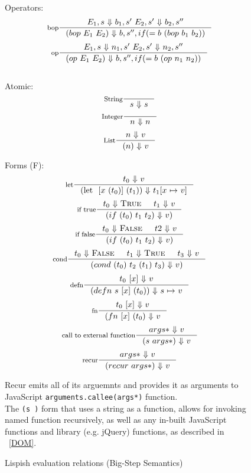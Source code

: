 \begin{figure}[h]
\centering
Operators:\
\[
\inference[bop]{E_1, s \ $$\Downarrow$$ \ b_1, s' \ E_2, s' \ $$\Downarrow$$ \ b_2, s''}
{(bop \ E_1 \ E_2) \ $$\Downarrow$$ \ b, s'', if (= b \ (bop \ b_1 \ b_2))}
\]
\[
\inference[op]{E_1, s \ $$\Downarrow$$ \ n_1, s' \ E_2, s' \ $$\Downarrow$$ \ n_2, s''}
{(op \ E_1 \ E_2) \ $$\Downarrow$$ \ b, s'', if (= b \ (op \ n_1 \ n_2))}
\] \\

\vspace*{15pt}
Atomic: \
\[
\inference[String]{}
{s \ $$\Downarrow$$ \ s}
\]
\[
\inference[Integer]{}
{n \ $$\Downarrow$$ \ n}
\]
\[
\inference[List]{n \ $$\Downarrow$$ \ v}
{(n) \ $$\Downarrow$$ \ v}
\]

\vspace*{15pt}
Forms (F): \
\[
\inference[let]{t_0 \ $$\Downarrow$$ \ v}
{(\text{let } \ {[x \ (t_0)]} \ (t_1)) \ $$\Downarrow$$ \ t_1 {[}x \ $$\mapsto$$ \ v{]} }
\]
\[
\inference[if true]{{t_0} \ $$\Downarrow$$ \ \textsc{True} & t_1 \ $$\Downarrow$$ \ v}
{(if \ (t_0) \ t_1 \ t_2) \ $$\Downarrow$$ \ v) }
\]
\[
\inference[if false]{t_0 \ $$\Downarrow$$ \ \textsc{False} & t2 \ $$\Downarrow$$ \ v}
{(if \ (t_0) \ t_1 \ t_2) \ $$\Downarrow$$ \ v) }
\]
\[
\inference[cond]{t_0 \ $$\Downarrow$$ \ \textsc{False} & t_1 \ $$\Downarrow$$ \ \textsc{True} & t_3 \ $$\Downarrow$$ \ v}
{(cond \ (t_0) \ t_2 \ (t_1) \ t_3) \ $$\Downarrow$$ \ v) }
\]
\[
\inference[defn]{ {t_0 \ [x]} \ $$\Downarrow$$ \ v}
{(defn \ s \ {[x]} \ (t_0)) \ $$\Downarrow$$ \ s \ $$\mapsto$$ \ v }
\]
\[
\inference[fn]{ {t_0 \ [x]} \ $$\Downarrow$$ \ v}
{(fn \ {[x]}  \ (t_0) \ $$\Downarrow$$ \ v }
\]
\[
\inference[call to external function]{ {args*} \ $$\Downarrow$$ \ v}
{(s \ {args*}) \ $$\Downarrow$$ \ v }
\]
\[
\inference[recur]{ {args*} \ $$\Downarrow$$ \ v}
{(recur \ {args*}) \ $$\Downarrow$$ \ v }
\]\vspace*{10pt}

Recur emits all of its arguemnts and provides it as arguments to JavaScript 
\texttt{arguments.callee(args*)} function. \\
The \texttt{(s )} form that uses a string as a function, allows for invoking named function recursively, as well as any in-built JavaScript functions and library (e.g. jQuery) functions, as described in ~\ref{DOM}.
\caption{Lispish evaluation relations (Big-Step Semantics)}
\label{fig:lispish-big-step}
\end{figure}
